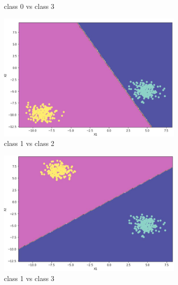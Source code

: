 \documentclass[11pt]{article}
\begin{document}
\begin{figure}[h]
\begin{subfigure}[b]{0.45\textwidth}
	\caption{class 0 vs class 3}
	\label{fig:fig1.1.7.3}
	\end{subfigure}
	\begin{subfigure}[b]{0.45\textwidth}
	\centering
	\includegraphics[scale=0.3]{dataset1a_perceptron_12_ds.jpg}
	\caption{class 1 vs class 2}
	\label{fig:fig1.1.7.4}
	\end{subfigure}
	\begin{subfigure}[b]{0.45\textwidth}
	\centering
	\includegraphics[scale=0.3]{dataset1a_perceptron_13_ds.jpg}
	\caption{class 1 vs class 3}
	\label{fig:fig1.1.7.5}
	\end{subfigure}
	\begin{subfigure}[b]{0.45\textwidth}
	\centering

\end{subfigure}
\end{figure}
\end{document}
